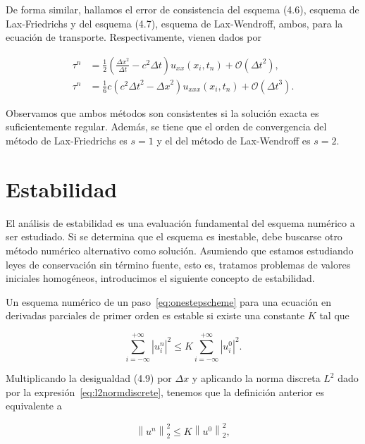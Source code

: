 De forma similar, hallamos el error de consistencia del
esquema (4.6), esquema de Lax-Friedrichs y del esquema (4.7),
esquema de Lax-Wendroff, ambos, para la ecuación de transporte.
Respectivamente, vienen dados por

\begin{align*}
  \tau^{n} & =
  \frac{1}{2}
  \left(
  \frac{{\Delta x}^{2}}{\Delta t}-
  c^{2}\Delta t
  \right)
  u_{xx}
  \left(x_{i},t_{n}\right)+
  \mathcal{O}
  \left({\Delta t}^{2}\right), \\
  \tau^{n} & =
  \frac{1}{6}
  c
  \left(
  c^{2}{\Delta t}^{2}-
  {\Delta x}^{2}
  \right)
  u_{xxx}\left(x_{i},t_{n}\right)+
  \mathcal{O}\left({\Delta t}^{3}\right).
\end{align*}

Observamos que ambos métodos son consistentes si la solución exacta
es suficientemente regular.
Además, se tiene que el orden de convergencia del método de
Lax-Friedrichs es $s=1$ y el del método de Lax-Wendroff es $s=2$.

\section{Estabilidad}

El análisis de estabilidad es una evaluación fundamental del esquema
numérico a ser estudiado.
Si se determina que el esquema es inestable, debe buscarse otro
método numérico alternativo como solución.
Asumiendo que estamos estudiando leyes de conservación sin
término fuente, esto es, tratamos problemas de valores iniciales
homogéneos, introducimos el siguiente concepto de estabilidad.

\begin{definition}
  Un esquema numérico de un paso~\eqref{eq:onestepscheme} para una
  ecuación en derivadas parciales de primer orden es estable si
  existe una constante $K$ tal que

  \begin{equation*}
    \sum_{i=-\infty}^{+\infty}
    {\left|u^{n}_{i}\right|}^{2}\leq
    K
    \sum_{i=-\infty}^{+\infty}
    {\left|u^{0}_{i}\right|}^{2}.
  \end{equation*}
\end{definition}

Multiplicando la desigualdad (4.9) por $\Delta x$ y aplicando la
norma discreta $L^{2}$ dado por la
expresión~\eqref{eq:l2normdiscrete}, tenemos que la definición
anterior es equivalente a

\begin{equation*}
  {\left\|u^{n}\right\|}^{2}_{2}\leq
  K
  {\left\|u^{0}\right\|}^{2}_{2},
\end{equation*}

